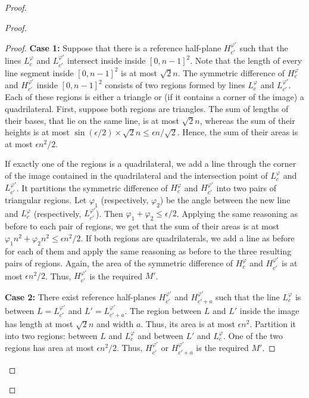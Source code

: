 \documentclass[11pt,english]{article}
\numberwithin{figure}{section}
\newcommand{\hp}[2]{H^{#1}_{#2}}\newcommand{\sepline}[2]{L^{#1}_{#2}}\newcommand{\hpi}[2]{M^{#1}_{#2}}\newcommand{\myerr}[1]{Err(#1)}
\newcommand{\mydelta}{\epsilon} \newcommand{\bigdelta}{{\epsilon_0}} \newcommand{\dsquares}{d_{\rm squares}}
\begin{document}
\begin{proof}
{\begin{proof}
\begin{proof}
{\bf Case 1:} Suppose that there is a reference half-plane $\hp{\varphi'}{c'}$ such that the lines $\sepline{\varphi}{c}$ and $\sepline{\varphi'}{c'}$ intersect inside inside $[0,n-1]^2$. Note that the length of every line segment inside $[0,n-1]^2$ is at most $\sqrt{2}n$. The symmetric difference of $\hp{\varphi}{c}$ and $\hp{\varphi'}{c'}$ inside $[0,n-1]^2$ consists of two regions
formed by lines $\sepline{\varphi}{c}$ and $\sepline{\varphi'}{c'}$. Each of these regions is either a triangle or (if it contains a corner of the image) a quadrilateral. First, suppose both regions are triangles. The sum of lengths of their bases, that lie on the same line, is at most $\sqrt{2}n$, whereas the sum of their heights is at most $\sin (\mydelta/2)\times\sqrt{2}n\leq \mydelta n/\sqrt{2}$. Hence, the sum of their areas is at most $\mydelta n^2/2$.

If exactly one of the regions is a quadrilateral, we add a line through the corner of the image contained in the quadrilateral and the intersection point of  $\sepline{\varphi}{c}$ and $\sepline{\varphi'}{c'}$. It partitions the symmetric difference of $\hp{\varphi}{c}$ and $\hp{\varphi'}{c'}$ into two pairs of triangular regions. Let $\varphi_1$ (respectively, $\varphi_2$) be the angle between the new line and $\sepline{\varphi}{c}$ (respectively, $\sepline{\varphi'}{c'}$). Then $\varphi_1+\varphi_2\leq\mydelta/2$. Applying the same reasoning as before to each pair of regions, we get that the sum of their areas is at most $\varphi_1 n^2+\varphi_2 n^2\leq \mydelta n^2/2$.
If both regions are quadrilaterals, we add a line as before for each of them and apply the same reasoning as before to the three resulting pairs of regions. Again, the area of the symmetric difference of $\hp{\varphi}{c}$ and $\hp{\varphi'}{c'}$ is at most $\mydelta n^2/2$. Thus, $\hp{\varphi'}{c'}$ is the required $M'$.

{\bf Case 2:} There exist reference half-planes $\hp{\varphi'}{c'}$ and $\hp{\varphi'}{c'+a}$ such that the line 
$\sepline{\varphi}{c}$ is between $L=\sepline{\varphi'}{c'}$ and $L'=\sepline{\varphi'}{c'+a}$. The region between $L$ and $L'$ inside the image has
length at most $\sqrt{2}n$ and width $a$. Thus, its area is at
most $\mydelta n^2$. Partition it into two regions: between $L$ and
$\sepline{\varphi}{c}$ and between $L'$ and $\sepline{\varphi}{c}$. One of the two regions has area at most
$\mydelta n^2/2$. Thus, $\hp{\varphi'}{c'}$ or $\hp{\varphi'}{c'+a}$ is the required $M'$.
\end{proof}


\end{proof}}
\end{proof}
\end{document}
